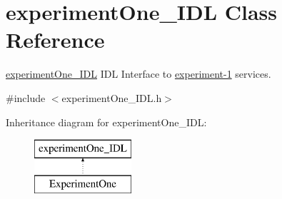 \section{experiment\-One\-\_\-\-I\-D\-L Class Reference}
\label{classexperimentOne__IDL}


\hyperlink{classexperimentOne__IDL}{experiment\-One\-\_\-\-I\-D\-L} I\-D\-L Interface to \hyperlink{group__experiment-1}{experiment-\/1} services.  




{\ttfamily \#include $<$experiment\-One\-\_\-\-I\-D\-L.\-h$>$}

Inheritance diagram for experiment\-One\-\_\-\-I\-D\-L\-:\begin{figure}[H]
\begin{center}
\leavevmode
\includegraphics[height=2.000000cm]{classexperimentOne__IDL}
\end{center}
\end{figure}
